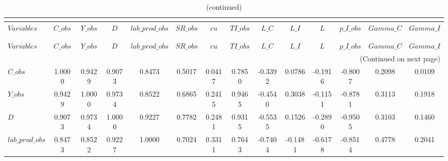  
\begin{center}
\begin{longtable}{lccccccccccccc} 
\caption{MATRIX OF CORRELATIONS}\\
 \label{Table:th_corr_matrix}\\
\toprule 
$Variables       $	 & 	 $           C\_obs$	 & 	 $           Y\_obs$	 & 	 $                 D$	 & 	 $  lab\_prod\_obs$	 & 	 $          SR\_obs$	 & 	 $                cu$	 & 	 $          TI\_obs$	 & 	 $             L\_C$	 & 	 $             L\_I$	 & 	 $                 L$	 & 	 $       p\_I\_obs$	 & 	 $         Gamma\_C$	 & 	 $         Gamma\_I$\\
\midrule \endfirsthead 
\caption{(continued)}\\
 \toprule \\ 
$Variables       $	 & 	 $           C\_obs$	 & 	 $           Y\_obs$	 & 	 $                 D$	 & 	 $  lab\_prod\_obs$	 & 	 $          SR\_obs$	 & 	 $                cu$	 & 	 $          TI\_obs$	 & 	 $             L\_C$	 & 	 $             L\_I$	 & 	 $                 L$	 & 	 $       p\_I\_obs$	 & 	 $         Gamma\_C$	 & 	 $         Gamma\_I$\\
\midrule \endhead 
\midrule \multicolumn{14}{r}{(Continued on next page)} \\ \bottomrule \endfoot 
\bottomrule \endlastfoot 
$C\_obs          $	 & 	            1.0000	 & 	            0.9429	 & 	            0.9073	 & 	            0.8473	 & 	            0.5017	 & 	            0.0417	 & 	            0.7850	 & 	           -0.3392	 & 	            0.0786	 & 	           -0.1916	 & 	           -0.8007	 & 	            0.2098	 & 	            0.0109 \\ 
$Y\_obs          $	 & 	            0.9429	 & 	            1.0000	 & 	            0.9734	 & 	            0.8522	 & 	            0.6865	 & 	            0.2415	 & 	            0.9465	 & 	           -0.4540	 & 	            0.3038	 & 	           -0.1151	 & 	           -0.8781	 & 	            0.3113	 & 	            0.1918 \\ 
$D               $	 & 	            0.9073	 & 	            0.9734	 & 	            1.0000	 & 	            0.9227	 & 	            0.7782	 & 	            0.2481	 & 	            0.9315	 & 	           -0.5535	 & 	            0.1526	 & 	           -0.2890	 & 	           -0.9505	 & 	            0.3103	 & 	            0.1460 \\ 
$lab\_prod\_obs  $	 & 	            0.8473	 & 	            0.8522	 & 	            0.9227	 & 	            1.0000	 & 	            0.7024	 & 	            0.3311	 & 	            0.7643	 & 	           -0.7404	 & 	           -0.1481	 & 	           -0.6178	 & 	           -0.8514	 & 	            0.4778	 & 	            0.2041 \\ 

\end{longtable}
\end{center}
